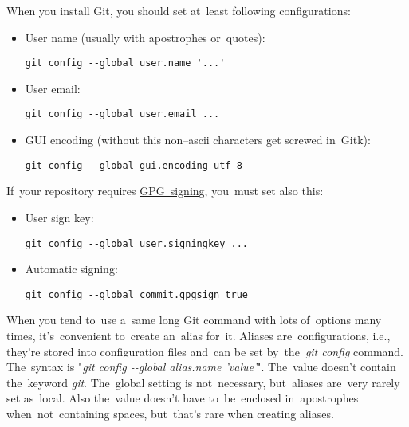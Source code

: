 When you install Git, you should set at~least following configurations:
\begin{itemize}
    \item User name (usually with apostrophes or~quotes):
        \begin{lstlisting}[frame=no, gobble=12]
            git config --global user.name '...'
        \end{lstlisting}
    \item User email:
        \begin{lstlisting}[frame=no, gobble=12]
            git config --global user.email ...
        \end{lstlisting}
    \item GUI encoding (without this non--ascii characters get screwed in~Gitk):
        \begin{lstlisting}[frame=no, gobble=12]
            git config --global gui.encoding utf-8
        \end{lstlisting}
\end{itemize}
\noindent If~your repository requires \hyperref[gitgpg]{GPG~signing}, you~must set also this:
\begin{itemize}
    \item User sign key:
        \begin{lstlisting}[frame=no, gobble=12]
            git config --global user.signingkey ...
        \end{lstlisting}
    \item Automatic signing:
        \begin{lstlisting}[frame=no, gobble=12]
            git config --global commit.gpgsign true
        \end{lstlisting}
\end{itemize}

When you tend to~use a~same long Git command with lots of~options many times, it's~convenient to~create an~alias for~it. Aliases are~configurations, i.e., they're stored into configuration files and~can be set by~the~\textit{git config} command. The~syntax is "\textit{git config -{}-global alias.name 'value'}". The~value doesn't contain the~keyword \textit{git}. The~global setting is not~necessary, but~aliases are~very rarely set as~local. Also the~value doesn't have to~be~enclosed in~apostrophes when~not~containing spaces, but~that's rare when creating aliases.\\

